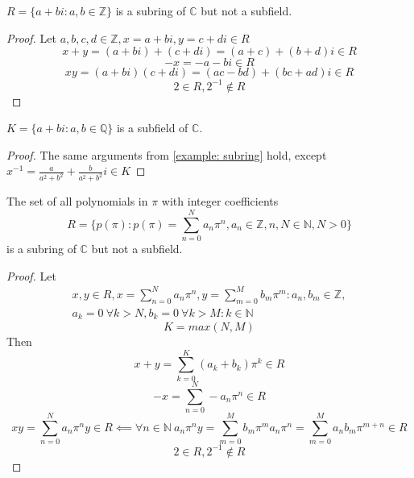 \begin{examples}
\begin{example} \label{example: subring}
    $R = \{a + bi : a,b \in \mathbb{Z}\}$ is a subring of $\mathbb{C}$ but not a subfield.
\end{example}
\begin{proof}
    Let $a,b,c,d \in \mathbb{Z}, x = a + bi, y = c + di \in R$
    \[x + y = (a + bi) + (c + di) = (a + c) + (b + d)i \in R\]
    \[-x = -a - bi \in R\]
    \[xy = (a + bi)(c + di) = (ac - bd) + (bc + ad)i \in R\]
    \[2 \in R, 2^{-1} \notin R\]
\end{proof}

\begin{example}
    $K = \{a + bi : a,b \in \mathbb{Q}\}$ is a subfield of $\mathbb{C}$.
\end{example}
\begin{proof}
    The same arguments from \cref{example: subring} hold, except
    $x^{-1} = \frac{a}{a^2 + b^2} + \frac{b}{a^2 + b^2}i \in K$
\end{proof}

\begin{example} \label{example: polynomials in pi with integer coefficients}
    The set of all polynomials in $\pi$ with integer coefficients
    \[R = \{p(\pi) : p(\pi) = \sum_{n = 0}^N a_n\pi^n,a_n \in \mathbb{Z},n,N \in \mathbb{N},N > 0\}\] 
    is a subring of $\mathbb{C}$ but not a subfield.
\end{example}
\begin{proof}
    Let 
    \begin{equation*}
    \begin{split}
        x, y \in R, 
        x = \sum_{n = 0}^N a_n\pi^n, 
        y = \sum_{m = 0}^M b_m\pi^m
            : a_n,b_m \in \mathbb{Z},\\
        a_k = 0\ \forall k > N,
        b_k = 0\ \forall k > M : k \in \mathbb{N}
    \end{split}
    \end{equation*}
    \[K = max(N, M)\]
    Then
    \[x + y = \sum_{k = 0}^K (a_k + b_k)\pi^k \in R\]
    \[-x = \sum_{n = 0}^N -a_n\pi^n \in R\]
    \[
        xy = \sum_{n = 0}^N a_n\pi^ny \in R \impliedby
        \forall n \in \mathbb{N} \ a_n\pi^ny = 
        \sum_{m = 0}^M b_m\pi^ma_n\pi^n = 
        \sum_{m = 0}^M a_nb_m\pi^{m + n} \in R
    \]
    \[2 \in R, 2^{-1} \notin R\]
\end{proof}


\end{examples}
